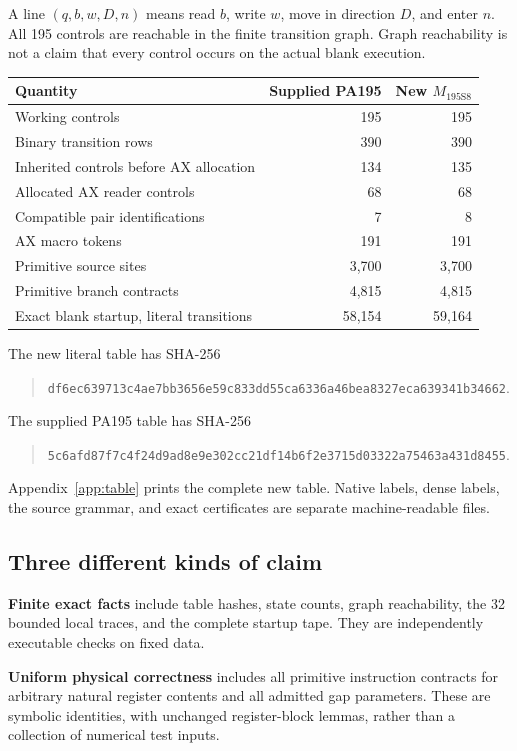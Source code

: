 \documentclass[11pt,letterpaper]{article}
\newcommand{\Mnew}{M_{\mathrm{195S8}}}
\begin{document}
A line \((q,b,w,D,n)\) means read $b$, write $w$, move in direction $D$,
and enter $n$. All 195 controls are reachable in the finite transition
graph. Graph reachability is not a claim that every control occurs on the
actual blank execution.

\begin{center}
\begin{tabular}{@{}lrr@{}}
\toprule
Quantity & Supplied PA195 & New $\Mnew$\\
\midrule
Working controls &195&195\\
Binary transition rows &390&390\\
Inherited controls before AX allocation &134&135\\
Allocated AX reader controls &68&68\\
Compatible pair identifications &7&8\\
AX macro tokens &191&191\\
Primitive source sites &3,700&3,700\\
Primitive branch contracts &4,815&4,815\\
Exact blank startup, literal transitions &58,154&59,164\\
\bottomrule
\end{tabular}
\end{center}
The new literal table has SHA-256
\begin{quote}\small
\nolinkurl{df6ec639713c4ae7bb3656e59c833dd55ca6336a46bea8327eca639341b34662}.
\end{quote}
The supplied PA195 table has SHA-256
\begin{quote}\small
\nolinkurl{5c6afd87f7c4f24d9ad8e9e302cc21df14b6f2e3715d03322a75463a431d8455}.
\end{quote}
Appendix~\ref{app:table} prints the complete new table. Native labels,
dense labels, the source grammar, and exact certificates are separate
machine-readable files.

\subsection{Three different kinds of claim}
\textbf{Finite exact facts} include table hashes, state counts, graph
reachability, the 32 bounded local traces, and the complete startup tape.
They are independently executable checks on fixed data.

\textbf{Uniform physical correctness} includes all primitive instruction
contracts for arbitrary natural register contents and all admitted gap
parameters. These are symbolic identities, with unchanged register-block
lemmas, rather than a collection of numerical test inputs.
\end{document}
